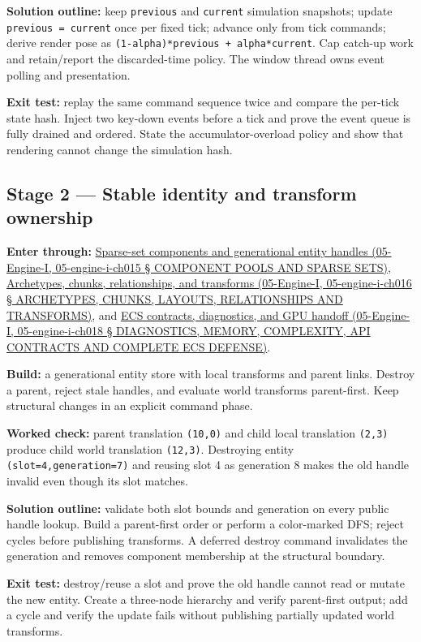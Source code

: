 \textbf{Solution outline:} keep \texttt{previous} and \texttt{current} simulation snapshots; update \texttt{previous\ =\ current} once per fixed tick; advance only from tick commands; derive render pose as \texttt{(1-alpha)*previous\ +\ alpha*current}. Cap catch-up work and retain/report the discarded-time policy. The window thread owns event polling and presentation.

\textbf{Exit test:} replay the same command sequence twice and compare the per-tick state hash. Inject two key-down events before a tick and prove the event queue is fully drained and ordered. State the accumulator-overload policy and show that rendering cannot change the simulation hash.

\subsection{Stage 2 --- Stable identity and transform ownership}\label{stage-2-stable-identity-and-transform-ownership}

\textbf{Enter through:} \href{}{Sparse-set components and generational entity handles (05-Engine-I, 05-engine-i-ch015 § COMPONENT POOLS AND SPARSE SETS)}, \href{}{Archetypes, chunks, relationships, and transforms (05-Engine-I, 05-engine-i-ch016 § ARCHETYPES, CHUNKS, LAYOUTS, RELATIONSHIPS AND TRANSFORMS)}, and \href{}{ECS contracts, diagnostics, and GPU handoff (05-Engine-I, 05-engine-i-ch018 § DIAGNOSTICS, MEMORY, COMPLEXITY, API CONTRACTS AND COMPLETE ECS DEFENSE)}.

\textbf{Build:} a generational entity store with local transforms and parent links. Destroy a parent, reject stale handles, and evaluate world transforms parent-first. Keep structural changes in an explicit command phase.

\textbf{Worked check:} parent translation \texttt{(10,0)} and child local translation \texttt{(2,3)} produce child world translation \texttt{(12,3)}. Destroying entity \texttt{(slot=4,generation=7)} and reusing slot 4 as generation 8 makes the old handle invalid even though its slot matches.

\textbf{Solution outline:} validate both slot bounds and generation on every public handle lookup. Build a parent-first order or perform a color-marked DFS; reject cycles before publishing transforms. A deferred destroy command invalidates the generation and removes component membership at the structural boundary.

\textbf{Exit test:} destroy/reuse a slot and prove the old handle cannot read or mutate the new entity. Create a three-node hierarchy and verify parent-first output; add a cycle and verify the update fails without publishing partially updated world transforms.

